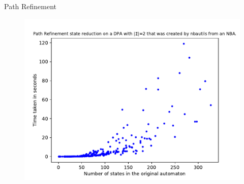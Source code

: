 \begin{frame}{Path Refinement}
\begin{figure}
	\centering
	\includegraphics[page=6,height=.8\textheight]{../data/analysis/path_refinement/detnbaut_ap1.pdf} 
\end{figure}
\end{frame}
%

